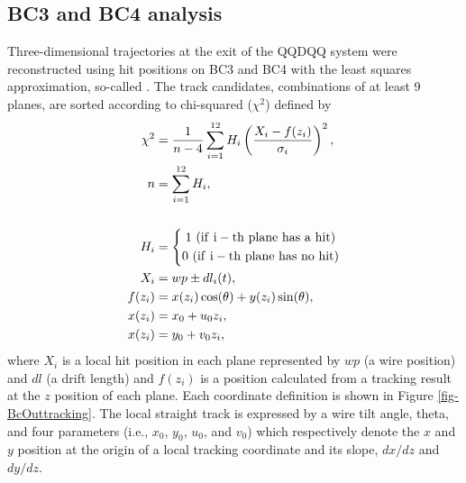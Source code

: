 \begin{comment}
\begin{figure}[!h]
  \begin{center}
    \texttt{[image: bh1fbft.png]}
    \caption{Correlation between the hit segment of BH1 and the hit position of BFT.}
    \label{fig: bh1bft}
  \end{center}
\end{figure}
\end{comment}

\subsection{BC3 and BC4 analysis}
Three-dimensional trajectories at the exit of the QQDQQ system were reconstructed using hit positions on BC3 and BC4 with the least squares approximation, so-called  \cite{Honda-D}. The track candidates, combinations of at least 9 planes, are sorted according to chi-squared ($\chi^2$) defined by
\begin{align}
  \chi^2 &= \frac{1}{n-4} \sum^{12}_{i=1}H_{i} \left( \frac{X_{i} - f(z_{i})}{\sigma_{i}} \right)^{2} , \\
  n &= \sum^{12}_{i=1}H_{i} , \nonumber \\
   \nonumber \\
  H_i &= \left\{ \begin{gathered} 1\ ({\rm if\ i-th\ plane\ has\ a\ hit}) \\ 0\ ({\rm if\ i-th\ plane\ has\ no\ hit}) \end{gathered}\right. \nonumber \\
  X_{i} &= wp \pm dl_{i}(t), \nonumber \\
  f(z_{i}) &= x(z_i)\cos(\theta) + y(z_i)\sin(\theta), \nonumber \\
  x(z_i) &= x_0 + u_0z_i, \nonumber \\
  x(z_i) &= y_0 + v_0z_i, \nonumber
\end{align}
where $X_i$ is a local hit position in each plane represented by $wp$ (a wire position) and $dl$ (a drift length) and $f(z_i)$ is a position calculated from a tracking result at the $z$ position of each plane. Each coordinate definition is shown in Figure \ref{fig-BcOuttracking}. The local straight track is expressed by a wire tilt angle, theta, and four parameters (i.e., $x_0$, $y_0$, $u_0$, and $v_0$) which respectively denote the $x$ and $y$ position at the origin of a local tracking coordinate and its slope, $dx/dz$ and $dy/dz$. 

